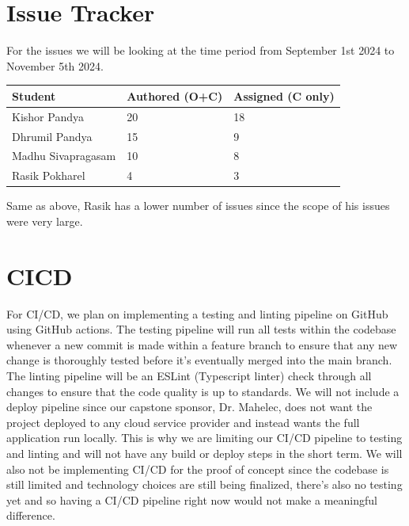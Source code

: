 \documentclass{article}
\begin{document}
\section{Issue Tracker}

For the issues we will be looking at the time period from September 1st 2024 to November 5th 2024.
\begin{table}[H]
\centering
\begin{tabular}{lll}
\toprule
\textbf{Student} & \textbf{Authored (O+C)} & \textbf{Assigned (C only)}\\
\midrule
Kishor Pandya & 20 & 18 \\
Dhrumil Pandya & 15 & 9 \\
Madhu Sivapragasam & 10 & 8 \\
Rasik Pokharel & 4 & 3 \\
\bottomrule
\end{tabular}
\end{table}

Same as above, Rasik has a lower number of issues since the scope of his issues were very large.

\section{CICD}

For CI/CD, we plan on implementing a testing and linting pipeline on GitHub using GitHub actions. The testing pipeline will run all tests within the codebase whenever a new commit is made within a feature branch to ensure that any new change is thoroughly tested before it's eventually merged into the main branch. The linting pipeline will be an ESLint (Typescript linter) check through all changes to ensure that the code quality is up to standards. We will not include a deploy pipeline since our capstone sponsor, Dr. Mahelec, does not want the project deployed to any cloud service provider and instead wants the full application run locally. This is why we are limiting our CI/CD pipeline to testing and linting and will not have any build or deploy steps in the short term. We will also not be implementing CI/CD for the proof of concept since the codebase is still limited and technology choices are still being finalized, there's also no testing yet and so having a CI/CD pipeline right now would not make a meaningful difference.
\end{document}
